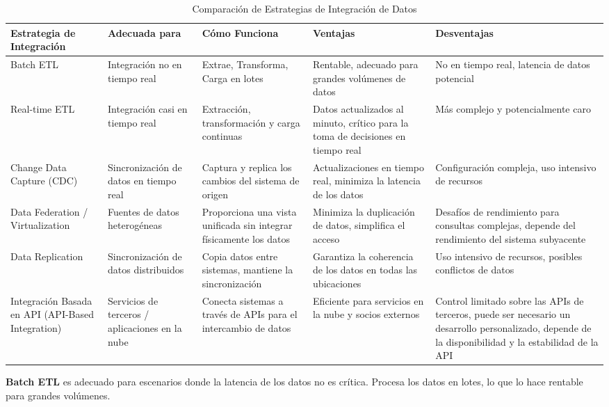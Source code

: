 \documentclass[12pt]{book}
\begin{document}
\begin{table}[h!]
\begin{adjustwidth}{-3em}{-3em}
\centering
\caption{Comparación de Estrategias de Integración de Datos}
\label{tab:integration_strategies}
\begin{tabular}{|p{2.5cm}|p{2.5cm}|p{4cm}|p{4cm}|p{4cm}|}
\hline
\textbf{Estrategia de Integración} & \textbf{Adecuada para} & \textbf{Cómo Funciona} & \textbf{Ventajas} & \textbf{Desventajas} \\
\hline
Batch ETL & Integración no en tiempo real & Extrae, Transforma, Carga en lotes & Rentable, adecuado para grandes volúmenes de datos & No en tiempo real, latencia de datos potencial \\
\hline
Real-time ETL & Integración casi en tiempo real & Extracción, transformación y carga continuas & Datos actualizados al minuto, crítico para la toma de decisiones en tiempo real & Más complejo y potencialmente caro \\
\hline
Change Data Capture (CDC) & Sincronización de datos en tiempo real & Captura y replica los cambios del sistema de origen & Actualizaciones en tiempo real, minimiza la latencia de los datos & Configuración compleja, uso intensivo de recursos \\
\hline
Data Federation / Virtualization & Fuentes de datos heterogéneas & Proporciona una vista unificada sin integrar físicamente los datos & Minimiza la duplicación de datos, simplifica el acceso & Desafíos de rendimiento para consultas complejas, depende del rendimiento del sistema subyacente \\
\hline
Data Replication & Sincronización de datos distribuidos & Copia datos entre sistemas, mantiene la sincronización & Garantiza la coherencia de los datos en todas las ubicaciones & Uso intensivo de recursos, posibles conflictos de datos \\
\hline
Integración Basada en API (API-Based Integration) & Servicios de terceros / aplicaciones en la nube & Conecta sistemas a través de APIs para el intercambio de datos & Eficiente para servicios en la nube y socios externos & Control limitado sobre las APIs de terceros, puede ser necesario un desarrollo personalizado, depende de la disponibilidad y la estabilidad de la API \\
\hline
\end{tabular}
\end{adjustwidth}
\end{table}


\noindent \textbf{Batch ETL} es adecuado para escenarios donde la latencia de los datos no es crítica. Procesa los datos en lotes, lo que lo hace rentable para grandes volúmenes.
\end{document}
